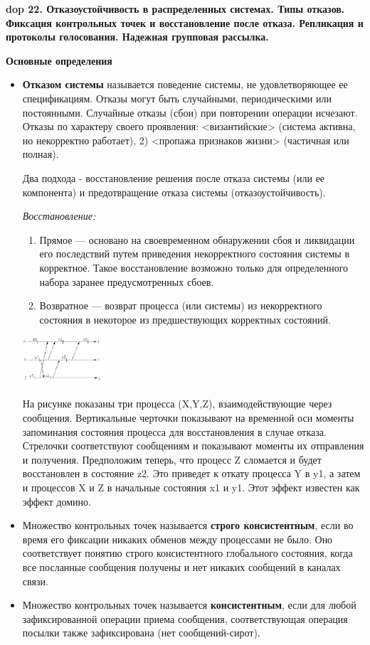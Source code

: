 \textbf{\LARGE dop 22. Отказоустойчивость  в  распределенных  системах.  Типы  отказов.  Фиксация  контрольных  точек  и восстановление после отказа. Репликация и протоколы голосования. Надежная групповая рассылка.}

\textbf{Основные определения}

\begin{itemize}
    \item \textbf{Отказом системы} называется поведение системы, не удовлетворяющее ее спецификациям.
    Отказы могут быть случайными, периодическими или постоянными. 
    Случайные отказы (сбои) при повторении операции исчезают. 
    Отказы по характеру своего проявления: <византийские> (система активна, но некорректно работает), 2) <пропажа признаков жизни> (частичная или полная). 
    
    Два подхода - восстановление решения после отказа системы (или ее компонента) и предотвращение отказа системы (отказоустойчивость).
    
    \textit{Восстановление:}
    \begin{enumerate}
        \item Прямое --- основано на своевременном обнаружении сбоя и ликвидации его последствий путем приведения некорректного состояния системы в корректное. 
        Такое восстановление возможно только для определенного набора заранее предусмотренных сбоев.
        \item Возвратное --- возврат процесса (или системы) из некорректного состояния в некоторое из предшествующих корректных состояний.
    \end{enumerate}
    
    \includegraphics[width=0.24\textwidth]{pics/effect_domino.png}
    
    На рисунке показаны три процесса (X,Y,Z), взаимодействующие через сообщения. Вертикальные черточки показывают на временной оси моменты запоминания состояния процесса для восстановления в случае отказа. Стрелочки соответствуют сообщениям и показывают моменты их отправления и получения. Предположим теперь, что процесс Z сломается и будет восстановлен в состояние z2. Это приведет к откату процесса Y в y1, а затем и процессов X и Z в начальные состояния x1 и y1. Этот эффект известен как эффект домино.
    
    \item Множество контрольных точек называется \textbf{строго консистентным}, если во время его фиксации никаких обменов между процессами не было. 
    Оно соответствует понятию строго консистентного глобального состояния, когда все посланные сообщения получены и нет никаких сообщений в каналах связи.
    \item Множество контрольных точек называется \textbf{консистентным}, если для любой зафиксированной операции приема сообщения, соответствующая операция посылки также зафиксирована (нет сообщений-сирот).
\end{itemize}

